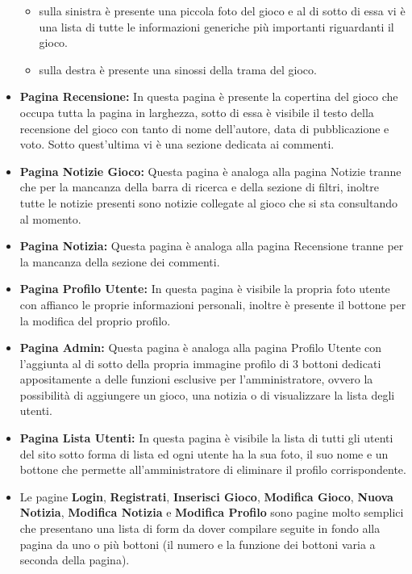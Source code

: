 \begin{itemize}
	\begin{itemize}
		\item sulla sinistra è presente una piccola foto del gioco e al di sotto di essa vi è una lista di tutte le informazioni generiche più importanti riguardanti il gioco.
		\item sulla destra è presente una sinossi della trama del gioco.
	\end{itemize}
	\item \textbf{Pagina Recensione:} In questa pagina è presente la copertina del gioco che occupa tutta la pagina in larghezza, sotto di essa è visibile il testo della recensione del gioco con tanto di nome dell’autore, data di pubblicazione e voto. Sotto quest’ultima vi è una sezione dedicata ai commenti.
	\item \textbf{Pagina Notizie Gioco:} Questa pagina è analoga alla pagina Notizie tranne che per la mancanza della barra di ricerca e della sezione di filtri, inoltre tutte le notizie presenti sono notizie collegate al gioco che si sta consultando al momento.
	\item \textbf{Pagina Notizia:} Questa pagina è analoga alla pagina Recensione tranne per la mancanza della sezione dei commenti.
	\item \textbf{Pagina Profilo Utente:} In questa pagina è visibile la propria foto utente con affianco le proprie informazioni personali, inoltre è presente il bottone per la modifica del proprio profilo.
	\item \textbf{Pagina Admin:} Questa pagina è analoga alla pagina Profilo Utente con l’aggiunta al di sotto della propria immagine profilo di 3 bottoni dedicati appositamente a delle funzioni esclusive per l’amministratore, ovvero la possibilità di aggiungere un gioco, una notizia o di visualizzare la lista degli utenti.
	\item \textbf{Pagina Lista Utenti:} In questa pagina è visibile la lista di tutti gli utenti del sito sotto forma di lista ed ogni utente ha la sua foto, il suo nome e un bottone che permette all’amministratore di eliminare il profilo corrispondente.
	\item Le pagine \textbf{Login}, \textbf{Registrati}, \textbf{Inserisci Gioco}, \textbf{Modifica Gioco}, \textbf{Nuova Notizia}, \textbf{Modifica Notizia} e \textbf{Modifica Profilo} sono pagine molto semplici che presentano una lista di form da dover compilare seguite in fondo alla pagina da uno o più bottoni (il numero e la funzione dei bottoni varia a seconda della pagina).
\end{itemize}





